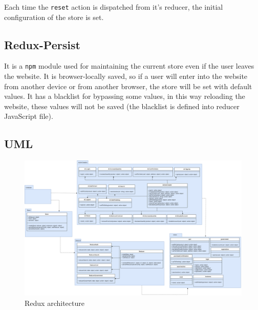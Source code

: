 Each time the \texttt{reset} action is dispatched from it's reducer, the initial configuration of the store is set.

\subsection{Redux-Persist}
It is a \texttt{npm} module used for maintaining the current store even if the user leaves the website. It is browser-locally saved, so if a user will enter into the website from another device or from another browser, the store will be set with default values. It has a blacklist for bypassing some values, in this way reloading the website, these values will not be saved (the blacklist is defined into reducer JavaScript file).

\begin{landscape}
	\subsection{UML} 
	
	\begin{figure}[H]
		\centering\includegraphics[scale = 0.3]{res/images/ReduxDiagram.png}
		\caption{Redux architecture}
	\end{figure}
\end{landscape}